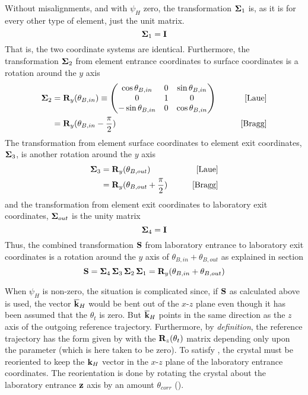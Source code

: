 Without misalignments, and with $\psi_H$ zero, the transformation
${\bf \Sigma}_1$ is, as it is for every other type of element,
just the unit matrix. 
\begin{equation}
  {\bf \Sigma}_1 = {\bf I}
\end{equation}
That is, the two coordinate systems are
identical. Furthermore, the transformation ${\bf \Sigma}_2$ from element
entrance coordinates to surface coordinates is a rotation around the $y$
axis
\begin{align}
  {\bf \Sigma}_2 &= {\bf R}_y(\theta_{B,in}) \equiv \begin{pmatrix}
     \cos\theta_{B,in} & 0 & \sin\theta_{B,in} \\
     0                 & 1 & 0                 \\
    -\sin\theta_{B,in} & 0 & \cos\theta_{B,in} \\
  \end{pmatrix}
  \qquad &\text{[Laue]}
  \label{mt0t010} \\
  &= {\bf R}_y(\theta_{B,in} - \frac{\pi}{2})
  \qquad &\text{[Bragg]} \nonumber
\end{align}
The transformation from element surface coordinates to element exit
coordinates, ${\bf \Sigma}_3$, is another rotation around the $y$ axis 
\begin{align}
  {\bf \Sigma}_3 &= {\bf R}_y(\theta_{B,out})
  \qquad &\text{[Laue]} \\
  &= {\bf R}_y(\theta_{B,out} + \frac{\pi}{2})
  \qquad &\text{[Bragg]} \nonumber
\end{align}
and the transformation from element exit coordinates
to laboratory exit coordinates, ${\bf \Sigma}_{out}$ is the unity matrix
\begin{equation}
  {\bf \Sigma}_4 = {\bf I}
\end{equation}
Thus, the combined transformation ${\bf S}$ from laboratory entrance to
laboratory exit coordinates is a rotation around the $y$ axis of
$\theta_{B,in}+\theta_{B,out}$ as explained in section
\begin{equation}
  {\bf S} = {\bf \Sigma}_4 \, {\bf \Sigma}_3 \, {\bf \Sigma}_2 \, {\bf \Sigma}_1 
  = {\bf R}_y(\theta_{B,in}+\theta_{B,out})
\end{equation}

When $\psi_H$ is non-zero, the situation is complicated since, if
${\bf S}$ as calculated above is used, the vector $\overline{{\bf k}}_H$ would be
bent out of the $x$-$z$ plane even though it has been assumed that the
 $\theta_t$ is zero. But $\overline{{\bf k}}_H$ points in the same
direction as the $z$ axis of the outgoing reference
trajectory. Furthermore, by {\em definition}, the reference trajectory
has the form given by  with the ${\bf R}_{z}(\theta_t)$ matrix
depending only upon the  parameter (which is here taken
to be zero). To satisfy , the crystal must be reoriented to
keep the ${\bf k}_H$ vector in the $x$-$z$ plane of the laboratory
entrance coordinates.  The reorientation is done by rotating the
crystal about the laboratory entrance ${\bf z}$ axis by an amount
$\theta_{corr}$ ().


